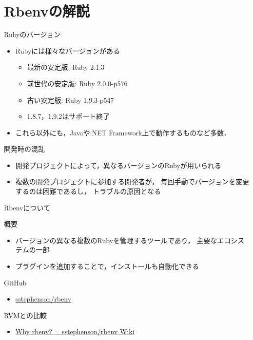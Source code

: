 \documentclass[t, aspectratio=169]{beamer}
\begin{document}
\section{Rbenvの解説}
\label{sec-3-1}
\begin{frame}[label=sec-3-1-1]{Rubyのバージョン}
\begin{itemize}
\item Rubyには様々なバージョンがある
\begin{itemize}
\item 最新の安定版: Ruby 2.1.3
\item 前世代の安定版: Ruby 2.0.0-p576
\item 古い安定版: Ruby 1.9.3-p547
\item 1.8.7，1.9.2はサポート終了
\end{itemize}
\item これら以外にも，Javaや.NET Framework上で動作するものなど多数．
\end{itemize}
\end{frame}

\begin{frame}[label=sec-3-1-2]{開発時の混乱}
\begin{itemize}
\item 開発プロジェクトによって，異なるバージョンのRubyが用いられる
\item 複数の開発プロジェクトに参加する開発者が，
毎回手動でバージョンを変更するのは困難であるし，
トラブルの原因となる
\end{itemize}
\end{frame}

\begin{frame}[label=sec-3-1-3]{Rbenvについて}
\begin{block}{概要}
\begin{itemize}
\item バージョンの異なる複数のRubyを管理するツールであり，
主要なエコシステムの一部
\item プラグインを追加することで，インストールも自動化できる
\end{itemize}
\end{block}

\begin{block}{GitHub}
\begin{itemize}
\item \href{https://github.com/sstephenson/rbenv}{sstephenson/rbenv}
\end{itemize}
\end{block}

\begin{block}{RVMとの比較}
\begin{itemize}
\item \href{https://github.com/sstephenson/rbenv/wiki/Why-rbenv\%3F}{Why rbenv? · sstephenson/rbenv Wiki}
\end{itemize}
\end{block}
\end{frame}
\end{document}
